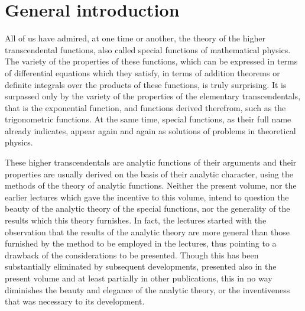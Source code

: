 \chapter*{General introduction}


All of us have admired, at one time or another, the theory of the higher transcendental functions, also called special functions of mathematical physics. The variety of the properties of these functions, which can be expressed in terms of differential equations which they satisfy, in terms of addition theorems or definite integrals over the products of these functions, is truly surprising. It is surpassed only by the variety of the properties of the elementary transcendentals, that is the exponential function, and functions derived therefrom, such as the trigonometric functions. At the same time, special functions, as their full name already indicates, appear again and again as solutions of problems in theoretical physics.

These higher transcendentals are analytic functions of their arguments and their properties are usually derived on the basis of their analytic character, using the methods of the theory of analytic functions. Neither the present volume, nor the earlier lectures which gave the incentive to this volume, intend to question the beauty of the analytic theory of the special functions, nor the generality of the results which this theory furnishes. In fact, the lectures started with the observation that the results of the analytic theory are more general than those furnished by the method to be employed in the lectures, thus pointing to a drawback of the considerations to be presented. Though this has been substantially eliminated by subsequent developments, presented also in the present volume and at least partially in other publications, this in no way diminishes the beauty and elegance of the analytic theory, or the inventiveness that was necessary to its development.

